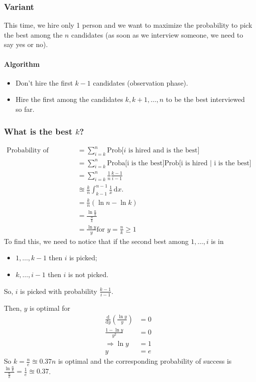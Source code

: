 \subsubsection{Variant}
This time, we hire only 1 person and we want to maximize the probability to pick the best among the $n$ candidates (as soon as we interview someone, we need to say yes or no).

\paragraph{Algorithm}
\begin{itemize}
\item Don't hire the first $k-1$ candidates (observation phase).
\item Hire the first among the candidates $k, k+1, \ldots, n$ to be the best interviewed so far.
\end{itemize}
\subsubsection{What is the best $k$?}
\begin{align*}
\text{Probability of success} &= \sum_{i=k}^n \text{Prob[$i$ is hired and is the best]}\\
&= \sum_{i=k}^n  \text{Proba[i is the best]} \text{Prob[i is hired | i is the best]}\\
&= \sum_{i=k}^n  \frac{1}{n} \frac{k-1}{i-1}\\
&\approxeq \frac{k}{n} \int_{k-1}^{n-1} \frac{1}{x} \, \mathrm{d}x.\\
&= \frac{k}{n} (\ln n - \ln k)\\
&= \frac{\ln \frac{n}{k}}{\frac{n}{k}}\\
&= \frac{\ln y}{y} \text{for $y = \frac{n}{k} \geq 1$}
\end{align*}
To find this, we need to notice that if the second best among $1,\ldots,i$ is in 
\begin{itemize}
\item $1,\ldots, k-1$ then $i$ is picked;
\item $k,\ldots, i-1$ then $i$ is not picked.
\end{itemize}
So, $i$ is picked with probability $\frac{k-1}{i-1}$.

Then, $y$ is optimal for 
\begin{align*}
\frac{\mathrm{d}}{\mathrm{d}y} \left(\frac{\ln y}{y} \right) &= 0\\
\frac{1- \ln y}{y^2} &= 0\\
\Rightarrow \ln y &= 1\\
y &= e
\end{align*}
So $k = \frac{n}{e} \approxeq 0.37n$ is optimal and the corresponding probability of success is $\frac{\ln \frac{n}{k}}{\frac{n}{k}} = \frac{1}{e} \approxeq 0.37$.



